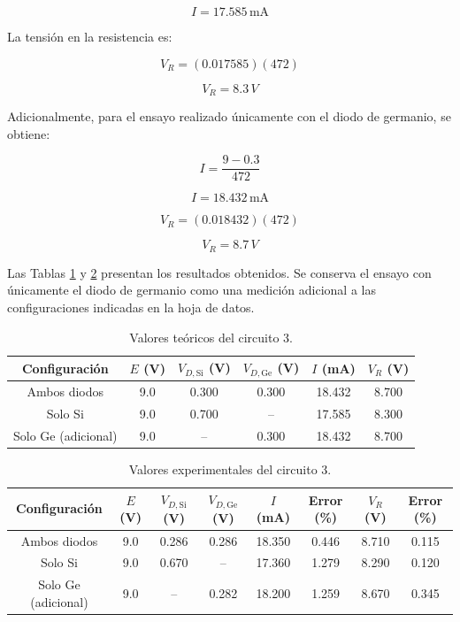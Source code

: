 \[
\boxed{I=17.585\,\text{mA}}
\]

La tensión en la resistencia es:

\[
V_R=(0.017585)(472)
\]

\[
\boxed{V_R=8.3\,V}
\]

Adicionalmente, para el ensayo realizado únicamente con el diodo de germanio, se obtiene:

\[
I=\frac{9-0.3}{472}
\]

\[
\boxed{I=18.432\,\text{mA}}
\]

\[
V_R=(0.018432)(472)
\]

\[
\boxed{V_R=8.7\,V}
\]

\vspace{0.3cm}

Las Tablas \ref{tab:c3_teoricos} y \ref{tab:c3_experimentales} presentan los resultados obtenidos. Se conserva el ensayo con únicamente el diodo de germanio como una medición adicional a las configuraciones indicadas en la hoja de datos.

\begin{table}[H]
\centering
\caption{Valores teóricos del circuito 3.}
\label{tab:c3_teoricos}
\scriptsize
\begin{tabular}{c c c c c c}
\hline
\textbf{Configuración} & \(E\) (V) &
\(V_{D,\text{Si}}\) (V) &
\(V_{D,\text{Ge}}\) (V) &
\(I\) (mA) & \(V_R\) (V) \\
\hline
Ambos diodos & 9.0 & 0.300 & 0.300 & 18.432 & 8.700 \\
Solo Si & 9.0 & 0.700 & -- & 17.585 & 8.300 \\
Solo Ge (adicional) & 9.0 & -- & 0.300 & 18.432 & 8.700 \\
\hline
\end{tabular}
\end{table}

\begin{table}[H]
\centering
\caption{Valores experimentales del circuito 3.}
\label{tab:c3_experimentales}
\scriptsize
\begin{tabular}{c c c c c c c c}
\hline
\textbf{Configuración} & \(E\) (V) &
\(V_{D,\text{Si}}\) (V) &
\(V_{D,\text{Ge}}\) (V) &
\(I\) (mA) & \textbf{Error (\%)} &
\(V_R\) (V) & \textbf{Error (\%)} \\
\hline
Ambos diodos & 9.0 & 0.286 & 0.286 & 18.350 & 0.446 & 8.710 & 0.115 \\
Solo Si & 9.0 & 0.670 & -- & 17.360 & 1.279 & 8.290 & 0.120 \\
Solo Ge (adicional) & 9.0 & -- & 0.282 & 18.200 & 1.259 & 8.670 & 0.345 \\
\hline
\end{tabular}
\end{table}

